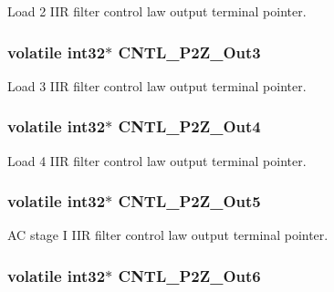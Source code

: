 Load 2 I\-I\-R filter control law output terminal pointer. \hypertarget{a00014_a11dcb9f6b6d03fe960ddf790e1ad5ed2}{
\subsubsection[{C\-N\-T\-L\-\_\-2\-P2\-Z\-\_\-\-Out3}]{\setlength{\rightskip}{0pt plus 5cm}volatile int32$\ast$ C\-N\-T\-L\-\_\-P2\-Z\-\_\-\-Out3}}\label{a00014_a11dcb9f6b6d03fe960ddf790e1ad5ed2}
Load 3 I\-I\-R filter control law output terminal pointer. \hypertarget{a00014_a253e4070b19470606e0566ff25fc911f}{
\subsubsection[{C\-N\-T\-L\-\_\-2\-P2\-Z\-\_\-\-Out4}]{\setlength{\rightskip}{0pt plus 5cm}volatile int32$\ast$ C\-N\-T\-L\-\_\-P2\-Z\-\_\-\-Out4}}\label{a00014_a253e4070b19470606e0566ff25fc911f}
Load 4 I\-I\-R filter control law output terminal pointer. \hypertarget{a00014_a3b336a91d25a7feb9f8927b32b800d0d}{
\subsubsection[{C\-N\-T\-L\-\_\-2\-P2\-Z\-\_\-\-Out5}]{\setlength{\rightskip}{0pt plus 5cm}volatile int32$\ast$ C\-N\-T\-L\-\_\-P2\-Z\-\_\-\-Out5}}\label{a00014_a3b336a91d25a7feb9f8927b32b800d0d}
A\-C stage I I\-I\-R filter control law output terminal pointer. \hypertarget{a00014_a3fa3864d3225e966af68bdea65781464}{
\subsubsection[{C\-N\-T\-L\-\_\-2\-P2\-Z\-\_\-\-Out6}]{\setlength{\rightskip}{0pt plus 5cm}volatile int32$\ast$ C\-N\-T\-L\-\_\-P2\-Z\-\_\-\-Out6}}\label{a00014_a3fa3864d3225e966af68bdea65781464}
